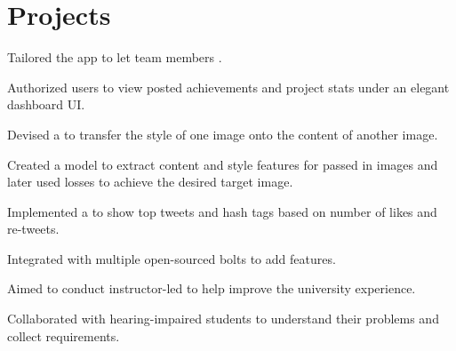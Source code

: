 \documentclass[]{rinkal_resume}
\begin{document}
\begin{minipage}[t]{0.69\textwidth}
\section{Projects}

\begin{tightemize}
\item Tailored the app to let team members .
\item Authorized users to view posted achievements and project stats under an elegant dashboard UI.
\end{tightemize}
\smallsectionsep

\begin{tightemize}
\item Devised a  to transfer the style of one image onto the content of another image.
\item Created a model to extract content and style features for passed in images and later used losses to achieve the desired target image.
\end{tightemize}
\smallsectionsep

\begin{tightemize}
\item Implemented a  to show top tweets and hash tags based on number of likes and re-tweets.
\item Integrated with multiple open-sourced bolts to add features.
\end{tightemize}
\smallsectionsep

\begin{tightemize}
\item Aimed to conduct instructor-led  to help improve the university experience.
\item Collaborated with hearing-impaired students to understand their problems and collect requirements.
\end{tightemize}
\smallsectionsep


\end{minipage}
\end{document}

